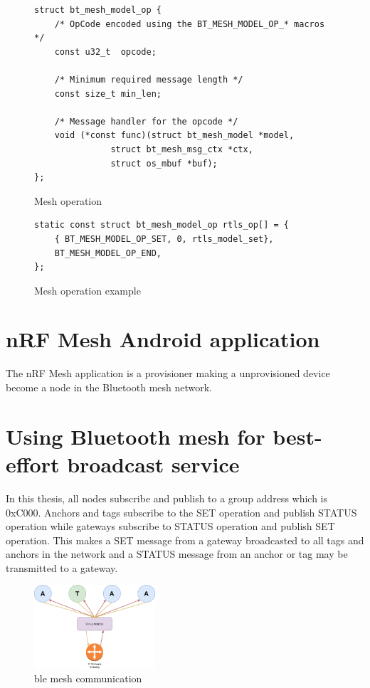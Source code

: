 \documentclass[\main/main.tex]{subfiles}
\begin{document}
\begin{figure}[H]
    \begin{lstlisting}[style=CStyle]
struct bt_mesh_model_op {
	/* OpCode encoded using the BT_MESH_MODEL_OP_* macros */
	const u32_t  opcode;

	/* Minimum required message length */
	const size_t min_len;

	/* Message handler for the opcode */
	void (*const func)(struct bt_mesh_model *model,
			   struct bt_mesh_msg_ctx *ctx,
			   struct os_mbuf *buf);
};
    \end{lstlisting}
    \caption{Mesh operation}
    \label{fig:mesh_model_operation}
\end{figure}

\begin{figure}[H]
    \begin{lstlisting}[style=CStyle]
static const struct bt_mesh_model_op rtls_op[] = {
    { BT_MESH_MODEL_OP_SET, 0, rtls_model_set},
    BT_MESH_MODEL_OP_END,
};
\end{lstlisting}
\caption{Mesh operation example}
\label{fig:mesh_model_operation_example}
\end{figure}

\section{nRF Mesh Android application}
The nRF Mesh application is a provisioner making a unprovisioned device become a node in the Bluetooth mesh network.

\section{Using Bluetooth mesh for best-effort broadcast service}
In this thesis, all nodes subscribe and publish to a group address which is 0xC000. Anchors and tags subscribe to the SET operation and publish STATUS operation while gateways subscribe to STATUS operation and publish SET operation. This makes a SET message from a gateway broadcasted to all tags and anchors in the network and a STATUS message from an anchor or tag may be transmitted to a gateway.

\begin{figure}[H]
    \begin{center}
        \includegraphics[width=0.4\textwidth]{ble_mesh_comunication.png}
    \end{center}
    \caption{ble mesh communication}
    \label{fig:ble_mesh_comunication}
\end{figure}

\bib
\end{document}
